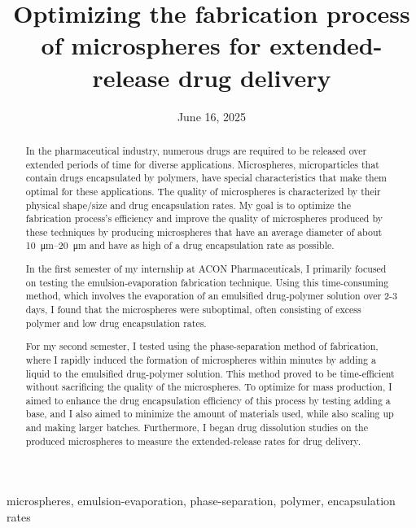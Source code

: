 ﻿\documentclass[12pt,conference,onecolumn]{IEEEtran}
\title{Optimizing the fabrication process of microspheres for extended-release drug delivery}
\author{%
\IEEEauthorblockN{Jake Schatz}\IEEEauthorblockA{Science \& Engineering\\Manalapan High School\\Englishtown, NJ\\425jschatz@frhsd.com}}
\date{June 16, 2025}
\newcommand{\keywords}{microspheres, emulsion-evaporation, phase-separation, polymer, encapsulation rates}
\begin{document}
\maketitle 

\begin{abstract}
In the pharmaceutical industry, numerous drugs are required to be released over extended periods of time for diverse applications. Microspheres, microparticles that contain drugs encapsulated by polymers, have special characteristics that make them optimal for these applications. The quality of microspheres is characterized by their physical shape/size and drug encapsulation rates. My goal is to optimize the fabrication process's efficiency and improve the quality of microspheres produced by these techniques by producing microspheres that have an average diameter of about \qtyrange{10}{20}{\micro\meter} and have as high of a drug encapsulation rate as possible.

In the first semester of my internship at ACON Pharmaceuticals, I primarily focused on testing the emulsion-evaporation fabrication technique. Using this time-consuming method, which involves the evaporation of an emulsified drug-polymer solution over 2-3 days, I found that the microspheres were suboptimal, often consisting of excess polymer and low drug encapsulation rates.

For my second semester, I tested using the phase-separation method of fabrication, where I rapidly induced the formation of microspheres within minutes by adding a liquid to the emulsified drug-polymer solution. This method proved to be time-efficient without sacrificing the quality of the microspheres. To optimize for mass production, I aimed to enhance the drug encapsulation efficiency of this process by testing adding a base, and I also aimed to minimize the amount of materials used, while also scaling up and making larger batches. Furthermore, I began drug dissolution studies on the produced microspheres to measure the extended-release rates for drug delivery.
\end{abstract}

\begin{IEEEkeywords}
\keywords
\end{IEEEkeywords}
\end{document}

